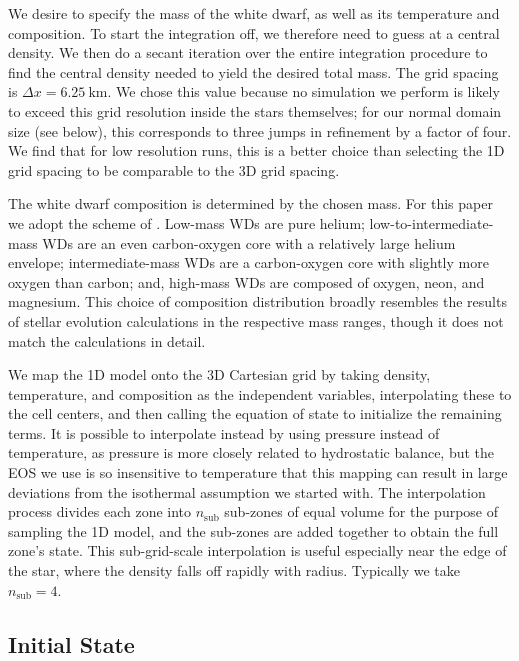 \documentclass[iop,numberedappendix]{../emulateapj}
\begin{document}
We desire to specify the mass of the white dwarf, as well as its
temperature and composition. To start the integration off, we
therefore need to guess at a central density.  We then do a secant
iteration over the entire integration procedure to find the central
density needed to yield the desired total mass.  The grid spacing is
$\Delta x = 6.25\ \text{km}$. We chose this value because no simulation
we perform is likely to exceed this grid resolution inside the stars 
themselves; for our normal domain size (see below), this corresponds to 
three jumps in refinement by a factor of four. We find that for low 
resolution runs, this is a better choice than selecting the 1D grid 
spacing to be comparable to the 3D grid spacing.

The white dwarf composition is determined by the chosen mass. For 
this paper we adopt the scheme of \cite{dan:2012}. Low-mass WDs 
are pure helium; low-to-intermediate-mass WDs are an even carbon-oxygen 
core with a relatively large helium envelope; intermediate-mass 
WDs are a carbon-oxygen core with slightly more oxygen than carbon; 
and, high-mass WDs are composed of oxygen, neon, and magnesium. 
This choice of composition distribution broadly resembles the 
results of stellar evolution calculations in the respective 
mass ranges, though it does not match the calculations in detail.

We map the 1D model onto the 3D Cartesian grid by taking density,
temperature, and composition as the independent variables,
interpolating these to the cell centers, and then calling the equation
of state to initialize the remaining terms. It is possible to interpolate
instead by using pressure instead of temperature, as pressure is more 
closely related to hydrostatic balance, but the EOS we use is so 
insensitive to temperature that this mapping can result in large 
deviations from the isothermal assumption we started with.  The 
interpolation process divides each zone into $n_{\text{sub}}$ 
sub-zones of equal volume for
the purpose of sampling the 1D model, and the sub-zones are added
together to obtain the full zone's state. This
sub-grid-scale interpolation is useful especially near the edge of the star,
where the density falls off rapidly with radius. Typically we take 
$n_{\text{sub}} = 4$.

\subsection{Initial State}
\label{sec:initial_state}
\end{document}
